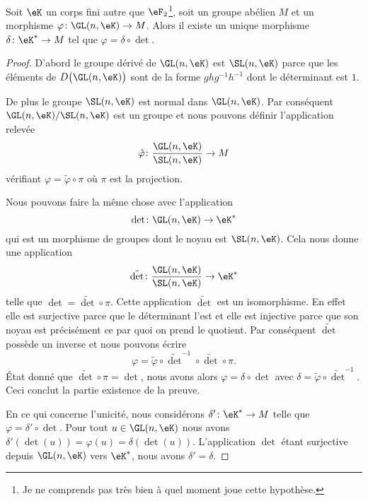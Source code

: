\begin{lemma}   \label{LemcDOTzM}
    Soit \( \eK\) un corps fini autre que \( \eF_2\)\footnote{Je ne comprends pas très bien à quel moment joue cette hypothèse.}, soit un groupe abélien \( M\) et un morphisme \( \varphi\colon \GL(n,\eK)\to M\). Alors il existe un unique morphisme \( \delta\colon \eK^*\to M\) tel que \( \varphi=\delta\circ\det\).
\end{lemma}

\begin{proof}
    D'abord le groupe dérivé de \( \GL(n,\eK)\) est \( \SL(n,\eK)\) parce que les éléments de \( D\big( \GL(n,\eK) \big)\) sont de la forme \( ghg^{-1}h^{-1}\) dont le déterminant est \( 1\).
    
    De plus le groupe \( \SL(n,\eK)\) est normal dans \( \GL(n,\eK)\). Par conséquent \( \GL(n,\eK)/\SL(n,\eK)\) est un groupe et nous pouvons définir l'application relevée
    \begin{equation}
        \tilde \varphi\colon \frac{ \GL(n,\eK) }{ \SL(n,\eK) }\to M
    \end{equation}
    vérifiant \( \varphi=\tilde \varphi\circ\pi\) où \( \pi\) est la projection. 

    Nous pouvons faire la même chose avec l'application
    \begin{equation}
        \det\colon \GL(n,\eK)\to \eK^*
    \end{equation}
    qui est un morphisme de groupes dont le noyau est \( \SL(n,\eK)\). Cela nous donne une application
    \begin{equation}
        \tilde \det\colon \frac{ \GL(n,\eK) }{ \SL(n,\eK) }\to \eK^*
    \end{equation}
    telle que \( \det=\tilde \det\circ\pi\). Cette application \( \tilde \det\) est un isomorphisme. En effet elle est surjective parce que le déterminant l'est et elle est injective parce que son noyau est précisément ce par quoi on prend le quotient. Par conséquent \( \tilde \det \) possède un inverse et nous pouvons écrire
    \begin{equation}
        \varphi=\tilde \varphi\circ\tilde \det^{-1}\circ\tilde \det\circ\pi.
    \end{equation}
    État donné que \( \tilde \det\circ\pi=\det\), nous avons alors \( \varphi=\delta\circ\det\) avec \( \delta=\tilde \varphi\circ\tilde \det^{-1}\). Ceci conclut la partie existence de la preuve.

    En ce qui concerne l'unicité, nous considérons \( \delta'\colon \eK^*\to M\) telle que \( \varphi=\delta'\circ\det\). Pour tout \( u\in \GL(n,\eK)\) nous avons \( \delta'(\det(u))=\varphi(u)=\delta(\det(u))\). L'application \( \det\) étant surjective depuis \( \GL(n,\eK)\) vers \( \eK^*\), nous avons \( \delta'=\delta\).
\end{proof}

